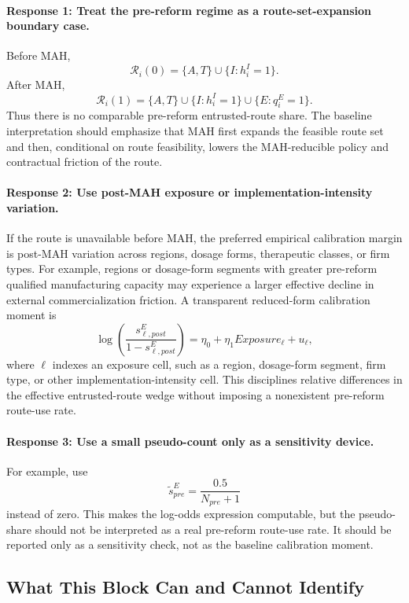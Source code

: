 \documentclass[12pt]{article}
\newcommand{\1}{\mathbf{1}}
\newcommand{\calR}{\mathcal{R}}
\begin{document}
\paragraph{Response 1: Treat the pre-reform regime as a route-set-expansion boundary case.}
Before MAH,
\[
    \calR_i(0)=\{A,T\}\cup\{I:h_i^I=1\}.
\]
After MAH,
\[
    \calR_i(1)=\{A,T\}\cup\{I:h_i^I=1\}\cup\{E:q_i^E=1\}.
\]
Thus there is no comparable pre-reform entrusted-route share. The baseline interpretation should emphasize that MAH first expands the feasible route set and then, conditional on route feasibility, lowers the MAH-reducible policy and contractual friction of the route.

\paragraph{Response 2: Use post-MAH exposure or implementation-intensity variation.}
If the route is unavailable before MAH, the preferred empirical calibration margin is post-MAH variation across regions, dosage forms, therapeutic classes, or firm types. For example, regions or dosage-form segments with greater pre-reform qualified manufacturing capacity may experience a larger effective decline in external commercialization friction. A transparent reduced-form calibration moment is
\[
    \log\left(\frac{s_{\ell,post}^E}{1-s_{\ell,post}^E}\right)
    =
    \eta_0+\eta_1 Exposure_\ell+u_\ell,
\]
where $\ell$ indexes an exposure cell, such as a region, dosage-form segment, firm type, or other implementation-intensity cell. This disciplines relative differences in the effective entrusted-route wedge without imposing a nonexistent pre-reform route-use rate.

\paragraph{Response 3: Use a small pseudo-count only as a sensitivity device.}
For example, use
\[
    \tilde{s}_{pre}^E
    =
    \frac{0.5}{N_{pre}+1}
\]
instead of zero. This makes the log-odds expression computable, but the pseudo-share should not be interpreted as a real pre-reform route-use rate. It should be reported only as a sensitivity check, not as the baseline calibration moment.

\subsection{What This Block Can and Cannot Identify}
\end{document}
